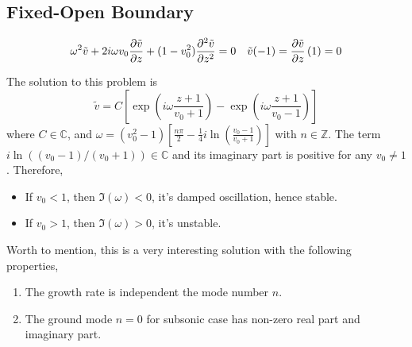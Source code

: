 \subsection{Fixed-Open Boundary}

\begin{equation} \label{eq:constant-v-problem-fixed-open}
	\omega^2\tilde{v} + 2i\omega v_0\pdv{\tilde{v}}{z} + (1-v_0^2)\pdv[2]{\tilde{v}}{z} = 0
	\quad
	\tilde{v}(-1) = \pdv{\tilde{v}}{z}\,(1) = 0
\end{equation}

The solution to this problem is
\begin{equation} \label{eq:constant-v-solution-fixed-open}
	\tilde{v} = C \left[\exp\left(i\omega\frac{z+1}{v_0+1}\right) 
  - \exp\left(i\omega\frac{z+1}{v_0-1}\right) \right]
\end{equation}
where $C\in\mathbb{C}$, and $\omega = (v_0^2 - 1) \left[\frac{n\pi}{2} - \frac{1}{4}i\ln(\frac{v_0-1}{v_0+1})\right]$ with $n\in\mathbb{Z}$. The term $i\ln((v_0-1)/(v_0+1))\in\mathbb{C}$ and its imaginary part is positive for any $v_0\neq 1$. Therefore,
\begin{itemize}
	\item If $v_0<1$, then $\Im(\omega)<0$, it's damped oscillation, hence stable.
	\item If $v_0>1$, then $\Im(\omega)>0$, it's unstable.
\end{itemize}

Worth to mention, this is a very interesting solution with the following properties,
\begin{enumerate}
	\item The growth rate is independent the mode number $n$.
	\item The ground mode $n=0$ for subsonic case has non-zero real part and imaginary part.
\end{enumerate}

